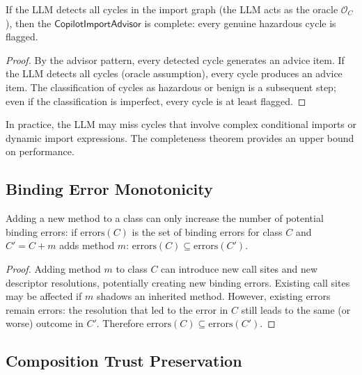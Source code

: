 \documentclass[11pt]{article}
\newcommand{\ImportAdv}{\mathsf{CopilotImportAdvisor}}
\begin{document}
\begin{theorem}
\label{thm:cycle-complete}
If the LLM detects all cycles in the import graph (\ie the
LLM acts as the oracle $\mathcal{O}_C$), then the $\ImportAdv$
is complete: every genuine hazardous cycle is flagged.
\end{theorem}

\begin{proof}
By the advisor pattern, every detected cycle generates an advice
item.  If the LLM detects all cycles (oracle assumption), every
cycle produces an advice item.  The classification of cycles as
hazardous or benign is a subsequent step; even if the
classification is imperfect, every cycle is at least flagged.
\end{proof}

\begin{remark}
\label{rem:completeness-gap}
In practice, the LLM may miss cycles that involve complex
conditional imports or dynamic import expressions.  The
completeness theorem provides an upper bound on performance.
\end{remark}

\subsection{Binding Error Monotonicity}
\label{sec:formal:binding}

\begin{theorem}
\label{thm:binding-mono}
Adding a new method to a class can only increase the number of
potential binding errors: if $\mathrm{errors}(C)$ is the set of
binding errors for class $C$ and $C' = C + m$ adds method $m$:
$\mathrm{errors}(C) \subseteq \mathrm{errors}(C')$.
\end{theorem}

\begin{proof}
Adding method $m$ to class $C$ can introduce new call sites
and new descriptor resolutions, potentially creating new binding
errors.  Existing call sites may be affected if $m$ shadows an
inherited method.  However, existing errors remain errors: the
resolution that led to the error in $C$ still leads to the same
(or worse) outcome in $C'$.  Therefore
$\mathrm{errors}(C) \subseteq \mathrm{errors}(C')$.
\end{proof}

\subsection{Composition Trust Preservation}
\label{sec:formal:comp}
\end{document}
